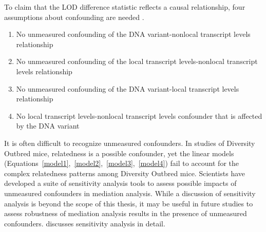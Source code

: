 \documentclass[oneside]{book}
\newenvironment{frameenv}[1]
    {\begin{myfloat}[tb]
    \begin{mdframed}[roundcorner=10pt,backgroundcolor=blue!10]
    \caption{#1}
    }
    {%
    \end{mdframed}\end{myfloat}
    }
\begin{document}

To claim that the LOD difference statistic reflects a causal relationship, four assumptions about confounding are needed \citep{vanderweele2015explanation}.



\begin{frameenv}{Four assumptions for causal inference}\label{frame1}
  \begin{enumerate}
\item No unmeasured confounding of the DNA variant-nonlocal transcript levels relationship
\item No unmeasured confounding of the local transcript levels-nonlocal transcript levels relationship
\item No unmeasured confounding of the DNA variant-local transcript levels relationship
\item No local transcript levels-nonlocal transcript levels confounder that is affected by the DNA variant
\end{enumerate}

\end{frameenv}



It is often difficult to recognize unmeasured confounders. In studies of Diversity Outbred mice, relatedness is a possible confounder, yet the linear models (Equations~\ref{model1},~\ref{model2},~\ref{model3},~\ref{model4}) fail to account for the complex relatedness patterns among Diversity Outbred mice. Scientists have developed a suite of sensitivity analysis tools to assess possible impacts of unmeasured confounders in mediation analysis. While a discussion of sensitivity analysis is beyond the scope of this thesis, it may be useful in future studies to assess robustness of mediation analysis results in the presence of unmeasured confounders. \citet{vanderweele2015explanation} discusses sensitivity analysis in detail. 
\end{document}
